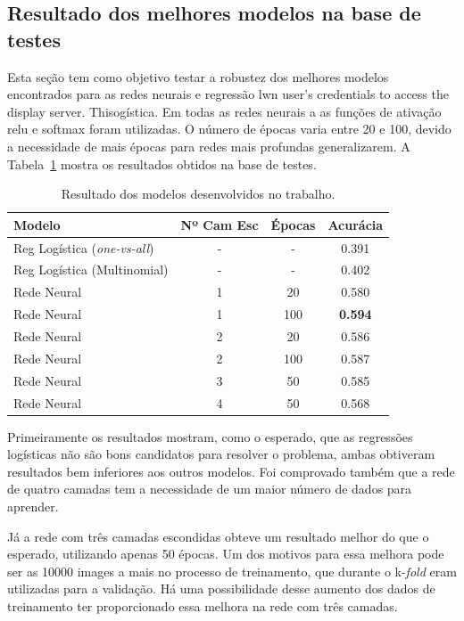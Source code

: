 \documentclass[conference]{IEEEtran}
\begin{document}
\subsection{Resultado dos melhores modelos na base de testes}

Esta seção tem como objetivo testar a robustez dos melhores modelos encontrados para as redes neurais e regressão lwn user's credentials to access the display server. Thisogística. Em todas as redes neurais a as funções de ativação relu e softmax foram utilizadas. O número de épocas varia entre 20 e 100, devido a necessidade de mais épocas para redes mais profundas generalizarem. A Tabela~\ref{tab:result} mostra os resultados obtidos na base de testes.

\begin{table}[h!]
	\centering	
	\begin{tabular}{lccc} \toprule
		\textbf{Modelo} & \textbf{Nº Cam Esc} & \textbf{Épocas} & \textbf{Acurácia}    \\ \toprule 	
		Reg Logística (\emph{one-vs-all}) & - & - & 0.391 \\
		Reg Logística (Multinomial) & - & - & 0.402 \\  \toprule 
	    Rede Neural & 1 & 20  & 0.580 \\
   	    Rede Neural & 1 & 100 & \textbf{0.594} \\
	    Rede Neural & 2 & 20  & 0.586 \\
	    Rede Neural & 2 & 100 & 0.587 \\
	    Rede Neural & 3 & 50  & 0.585 \\
   	    Rede Neural & 4 & 50 &  0.568\\
	    
		\bottomrule      
	\end{tabular}
	\caption{Resultado dos modelos desenvolvidos no trabalho.}
	\label{tab:result}
\end{table}

Primeiramente os resultados mostram, como o esperado, que as regressões logísticas não são bons candidatos para resolver o problema, ambas obtiveram resultados bem inferiores aos outros modelos. Foi comprovado também que a rede de quatro camadas tem a necessidade de um maior número de dados para aprender.

Já a rede com três camadas escondidas obteve um resultado melhor do que o esperado, utilizando apenas 50 épocas. Um dos motivos para essa melhora pode ser as 10000 images a mais no processo de treinamento, que durante o k-\emph{fold} eram utilizadas para a validação. Há uma possibilidade desse aumento dos dados de treinamento ter proporcionado essa melhora na rede com três camadas.
\end{document}
